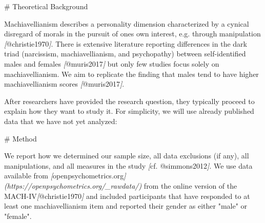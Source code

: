 \documentclass[psych,tutorial,submit,moreauthors,pdftex]{mdpi}
\newenvironment{Shaded}{\begin{snugshade}}{\end{snugshade}}
\newcommand{\CommentTok}[1]{\textcolor[rgb]{0.56,0.35,0.01}{\textit{#1}}}
\newcommand{\FunctionTok}[1]{\textcolor[rgb]{0.00,0.00,0.00}{#1}}
\newcommand{\NormalTok}[1]{#1}
\newcommand{\OtherTok}[1]{\textcolor[rgb]{0.56,0.35,0.01}{#1}}
\begin{document}
\begin{Shaded}
\begin{Highlighting}[]
\FunctionTok{\# Theoretical Background}

\NormalTok{Machiavellianism describes a personality dimension characterized by a}
\NormalTok{cynical disregard of morals in the pursuit of one\textquotesingle{}s own interest, e.g.}
\NormalTok{through manipulation }\CommentTok{[}\OtherTok{@christie1970}\CommentTok{]}\NormalTok{. There is extensive literature reporting}
\NormalTok{differences in the dark triad (narcissism, machiavellianism, and psychopathy)}
\NormalTok{between self{-}identified males and females }\CommentTok{[}\OtherTok{@muris2017}\CommentTok{]}\NormalTok{ but only few studies}
\NormalTok{focus solely on machiavellianism. We aim to replicate the finding that males}
\NormalTok{tend to have higher machiavellianism scores }\CommentTok{[}\OtherTok{@muris2017}\CommentTok{]}\NormalTok{.}
\end{Highlighting}
\end{Shaded}

After researchers have provided the research question, they typically
proceed to explain how they want to study it. For simplicity, we will
use already published data that we have not yet analyzed:

\begin{Shaded}
\begin{Highlighting}[]
\FunctionTok{\# Method}

\NormalTok{We report how we determined our sample size, all data exclusions (if any), all}
\NormalTok{manipulations, and all measures in the study }\CommentTok{[}\OtherTok{cf. @simmons2012}\CommentTok{]}\NormalTok{. We use data}
\NormalTok{available from }\CommentTok{[}\OtherTok{openpsychometrics.org}\CommentTok{](https://openpsychometrics.org/\_rawdata/)}
\NormalTok{from the online version of the MACH{-}IV}\CommentTok{[}\OtherTok{@christie1970}\CommentTok{]}\NormalTok{ and included participants}
\NormalTok{that have responded to at least one machiavellianism item and reported their}
\NormalTok{gender as either "male" or "female".}
\end{Highlighting}
\end{Shaded}
\end{document}
